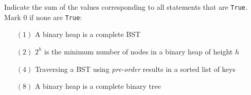 \documentclass[12pt,addpoints]{exam}
\begin{document}
\begin{questions}
\question[5] 
Indicate the sum of the values corresponding to all statements that are \verb|True|.  Mark $0$ if none are \verb|True|:
\begin{itemize}
	\item[$(1)$] A binary heap is a complete BST
	\item[$(2)$] $2^h$ is the minimum number of nodes in a binary heap of height $h$
	\item[$(4)$] Traversing a BST using {\it pre-order} results in a sorted list of keys
	\item[$(8)$] A binary heap is a complete binary tree\end{itemize}
\answerline

\end{questions}
\end{document}
